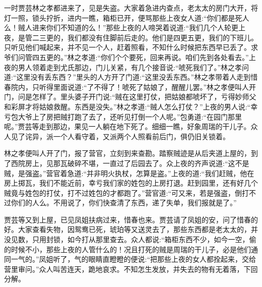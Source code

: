 \begin{parag}
    一时贾芸林之孝都进来了，见是失盗。大家着急进内查点，老太太的房门大开，将灯一照，锁头拧折，进内一瞧，箱柜已开，便骂那些上夜女人道:“你们都是死人么！贼人进来你们不知道的么！”那些上夜的人啼哭着说道:“我们几个人轮更上夜，是管二三更的，我们都没有住脚前后走的。他们是四更五更，我们的下班儿。只听见他们喊起来，并不见一个人，赶着照看，不知什么时候把东西早已丢了。求爷们问管四五更的。”林之孝道:“你们个个要死，回来再说。咱们先到各处看去。”上夜的男人领着走到尤氏那边，门儿关紧，有几个接音说:“唬死我们了。”林之孝问道:“这里没有丢东西？”里头的人方开了门道:“这里没丢东西。”林之孝带着人走到惜春院内，只听得里面说道:“了不得了！唬死了姑娘了，醒醒儿罢。”林之孝便叫人开门，问是怎样了。里头婆子开门说:“贼在这里打仗，把姑娘都唬坏了，亏得妙师父和彩屏才将姑娘救醒。东西是没失。”林之孝道:“贼人怎么打仗？”上夜的男人说:“幸亏包大爷上了房把贼打跑了去了，还听见打倒一个人呢。”包勇道:“在园门那里呢。”贾芸等走到那边，果见一人躺在地下死了。细细一瞧，好象周瑞的干儿子。众人见了诧异，派一个人看守着，又派两个人照看前后门，俱仍旧关锁着。
\end{parag}


\begin{parag}
    林之孝便叫人开了门，报了营官，立刻到来查勘。踏察贼迹是从后夹道上屋的，到了西院房上，见那瓦破碎不堪，一直过了后园去了。众上夜的齐声说道:“这不是贼，是强盗。”营官着急道:“并非明火执杖，怎算是盗。”上夜的道:“我们赶贼，他在房上掷瓦，我们不能近前，幸亏我们家的姓包的上房打退。赶到园里，还有好几个贼竟与姓包的打仗，打不过姓包的才都跑了。”营官道:“可又来，若是强盗，倒打不过你们的人么。不用说了，你们快查清了东西，递了失单，我们报就是了。”
\end{parag}


\begin{parag}
    贾芸等又到上屋，已见凤姐扶病过来，惜春也来。贾芸请了凤姐的安，问了惜春的好。大家查看失物，因鸳鸯已死，琥珀等又送灵去了，那些东西都是老太太的，并没见数，只用封锁，如今打从那里查去。众人都说:“箱柜东西不少，如今一空，偷的时候不小，那些上夜的人管什么的！况且打死的贼是周瑞的干儿子，必是他们通同一气的。”凤姐听了，气的眼睛直瞪瞪的便说:“把那些上夜的女人都拴起来，交给营里审问。”众人叫苦连天，跪地哀求。不知怎生发放，并失去的物有无着落，下回分解。
\end{parag}